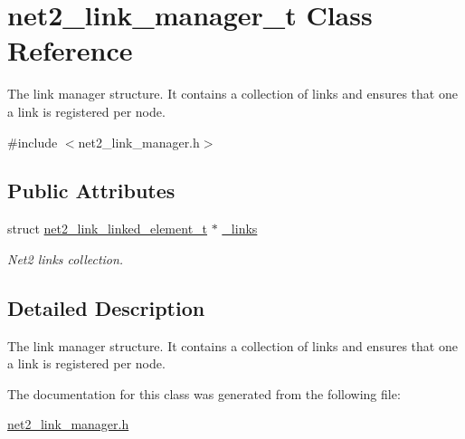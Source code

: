 \hypertarget{structnet2__link__manager__t}{\section{net2\-\_\-link\-\_\-manager\-\_\-t Class Reference}
\label{structnet2__link__manager__t}
}


The link manager structure. It contains a collection of links and ensures that one a link is registered per node.  




{\ttfamily \#include $<$net2\-\_\-link\-\_\-manager.\-h$>$}

\subsection*{Public Attributes}
\begin{DoxyCompactItemize}
\item 
\hypertarget{structnet2__link__manager__t_af6acfc2ac12140909d049f52d881d78a}{struct \hyperlink{structnet2__link__linked__element__t}{net2\-\_\-link\-\_\-linked\-\_\-element\-\_\-t} $\ast$ \hyperlink{structnet2__link__manager__t_af6acfc2ac12140909d049f52d881d78a}{\-\_\-links}}\label{structnet2__link__manager__t_af6acfc2ac12140909d049f52d881d78a}

\begin{DoxyCompactList}\small\item\em Net2 links collection. \end{DoxyCompactList}\end{DoxyCompactItemize}


\subsection{Detailed Description}
The link manager structure. It contains a collection of links and ensures that one a link is registered per node. 

The documentation for this class was generated from the following file\-:\begin{DoxyCompactItemize}
\item 
\hyperlink{net2__link__manager_8h}{net2\-\_\-link\-\_\-manager.\-h}\end{DoxyCompactItemize}
